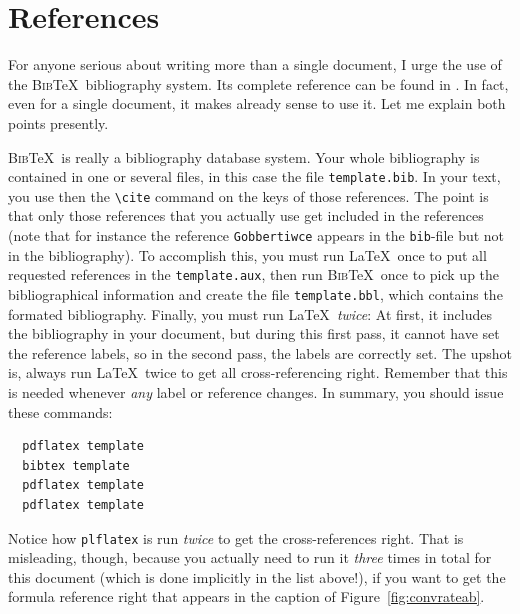\documentclass[12pt]{article}
\numberwithin{equation}{section}
\numberwithin{table}{section}
\numberwithin{figure}{section}
\begin{document}
\section{References} \label{sec:references}

For anyone serious about writing more than a single document, I urge
the use of the \textsc{Bib}\TeX\ bibliography system. Its complete
reference can be found in \cite[Appendix B]{Lamport94}.
In fact, even for a single document, it makes already sense to use it.
Let me explain both points presently.

\textsc{Bib}\TeX\ is really a bibliography database system. Your whole
bibliography is contained in one or several files, in this case the file
\verb+template.bib+. In your text, you use then the \verb+\cite+ command
on the keys of those references. The point is that only those references
that you actually use get included in the references (note that for
instance the reference \verb+Gobbertiwce+ appears in the \verb+bib+-file
but not in the bibliography). To accomplish this,
you must run \LaTeX\ once to put all requested references in the
\verb+template.aux+, then run \textsc{Bib}\TeX\ once to pick up the
bibliographical information and create the file \verb+template.bbl+,
which contains the formated bibliography. Finally, you must run \LaTeX\
\emph{twice}: At first, it includes the bibliography in your document,
but during this first pass, it cannot have set the reference labels,
so in the second pass, the labels are correctly set. The upshot is,
always run \LaTeX\ twice to get all cross-referencing right. Remember
that this is needed whenever \emph{any} label or reference changes.
In summary, you should issue these commands:
\begin{verbatim}
  pdflatex template
  bibtex template
  pdflatex template
  pdflatex template
\end{verbatim}
Notice how \verb+plflatex+ is run \emph{twice} to get the cross-references
right. That is misleading, though, because you actually need to run
it \emph{three} times in total for this document
(which is done implicitly in the list above!),
if you want to get the formula reference right that appears in the caption
of Figure~\ref{fig:convrateab}.
\end{document}
